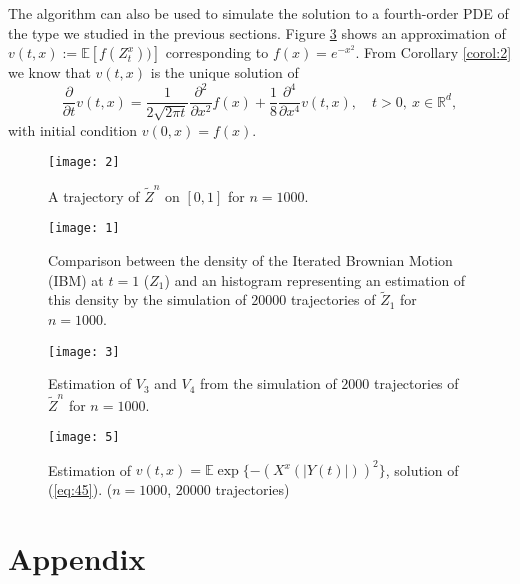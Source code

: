 \documentclass[a4paper, 11pt]{article}
\newcommand{\R}{\mathbb{R}}
\newcommand{\E}{\mathbb{E}}
\newcommand{\1}{\mathbf{1}}
\begin{document}
\bigskip

\noindent The algorithm can also be used to simulate the solution to a fourth-order PDE of the type we studied in the previous sections. Figure \ref{fig:5} shows an approximation of $v(t,x):=\E \left[f(Z^x_t))\right]$ corresponding to $f(x)=e^{-x^2}$. From Corollary \ref{corol:2} we know that $v(t,x)$ is the unique solution of
\begin{equation}
\label{eq:45}
\frac{\partial}{\partial t}v(t,x)=\frac{1}{2\sqrt{2\pi t}}\frac{\partial^2}{\partial x^2}f(x)+\frac{1}{8}\frac{\partial^4}{\partial x^4}v(t,x), \quad t>0,\ x\in\R^d,
\end{equation}
with initial condition $v(0,x)=f(x)$. 
\begin{figure}[h]
\begin{center}
\texttt{[image: 2]}
\end{center}
\caption{\label{fig:1} A trajectory of $\tilde{Z}^n$ on $[0,1]$ for $n=1000$.}
\begin{center}
\texttt{[image: 1]}
\end{center}
\caption{\label{fig:2}Comparison between the density of the Iterated Brownian Motion (IBM) at $t=1$ ($Z_1$) and an histogram representing an estimation of this density by the simulation of $20000$ trajectories of $\tilde{Z}_1$ for $n=1000$.}
\end{figure}

\begin{figure}[h]
\begin{center}
\texttt{[image: 3]}
\end{center}
\caption{\label{fig:3} Estimation of $V_3$ and $V_4$ from the simulation of $2000$ trajectories of $\tilde{Z}^n$ for $n=1000$.}
\end{figure}

\bigskip

\begin{figure}[h]
\begin{center}
\texttt{[image: 5]}
\end{center}
\caption{\label{fig:5} Estimation of $v(t,x)=\E \exp\{-(X^x(|Y(t)|))^2\}$, solution of (\ref{eq:45}). ($n=1000$, $20000$ trajectories)} 
\end{figure}

\section{Appendix}\label{appendix}
\end{document}
